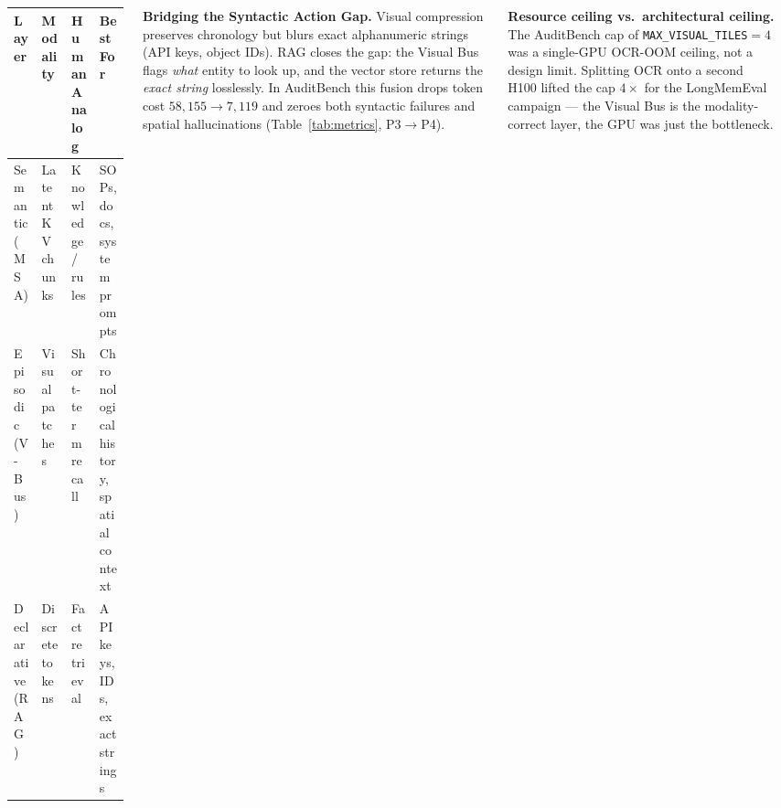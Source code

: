 \documentclass[25pt, a0paper, landscape, blockverticalspace=5mm]{tikzposter}
\begin{document}
\begin{columns}
{        {
            \centering
            \label{tab:modality-matrix}

            \vspace{0.5em}
            \footnotesize
            \begin{tabularx}{\linewidth}{@{} l l >{\raggedright\arraybackslash}X >{\raggedright\arraybackslash}X @{}}
                \toprule
                \textbf{Layer}    & \textbf{Modality} & \textbf{Human Analog} & \textbf{Best For}                      \\
                \midrule
                Semantic (MSA)    & Latent KV chunks  & Knowledge / rules     & SOPs, docs, system prompts             \\
                Episodic (V-Bus)  & Visual patches    & Short-term recall     & Chronological history, spatial context \\
                Declarative (RAG) & Discrete tokens   & Fact retrieval        & API keys, IDs, exact strings           \\
                \bottomrule
            \end{tabularx}
        }

        \vspace{1em}
        \textbf{Bridging the Syntactic Action Gap.} Visual compression preserves chronology but blurs exact alphanumeric strings (API keys, object IDs). RAG closes the gap: the Visual Bus flags \emph{what} entity to look up, and the vector store returns the \emph{exact string} losslessly. In AuditBench this fusion drops token cost $58{,}155 \to 7{,}119$ and zeroes both syntactic failures and spatial hallucinations (Table~\ref{tab:metrics}, P3$\to$P4).

        \vspace{0.4em}
        \textbf{Resource ceiling vs.\ architectural ceiling.} The AuditBench cap of \texttt{MAX\_VISUAL\_TILES}$=4$ was a single-GPU OCR-OOM ceiling, not a design limit. Splitting OCR onto a second H100 lifted the cap $4\times$ for the LongMemEval campaign --- the Visual Bus is the modality-correct layer, the GPU was just the bottleneck.
    }


\end{columns}
\end{document}

